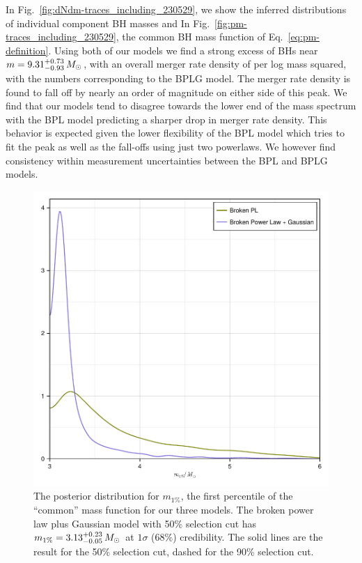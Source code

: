 \documentclass[modern]{aastex631}
\begin{document}
In Fig.~\ref{fig:dNdm-traces_including_230529}, we show the inferred
distributions of individual component BH masses and In
Fig.~\ref{fig:pm-traces_including_230529}, the common BH mass function of
Eq.~\eqref{eq:pm-definition}. Using both of our models we find a strong excess
of BHs near $m=9.31^{+0.73}_{-0.93} \, M_\odot$, with an overall merger rate density of
\dNlogmpeakincludingnewunits per log mass squared, with the numbers corresponding to the BPLG model. The merger rate density is found to fall off by nearly an order of
magnitude on either side of this peak. We find that our models tend to disagree
towards the lower end of the mass spectrum with the BPL model predicting a
sharper drop in merger rate density. This behavior is expected given the lower
flexibility of the BPL model which tries to fit the peak as well as the
fall-offs using just two powerlaws. We however find consistency within
measurement uncertainties between the BPL and BPLG models.

\begin{figure}
    \includegraphics[width=\columnwidth]{figures/m1pct_including_230529.pdf}
    \caption{\label{fig:m1pct_including_230529} The posterior distribution for $m_{1\%}$, the
    first percentile of the ``common'' mass function for our three models.  The
    broken power law plus Gaussian model with 50\% selection cut has $m_{1\%} =
    3.13^{+0.23}_{-0.05} \, M_\odot$ at $1\sigma$ (68\%) credibility.  The solid lines are
    the result for the 50\% selection cut, dashed for the 90\% selection cut.}
\end{figure}
\end{document}
